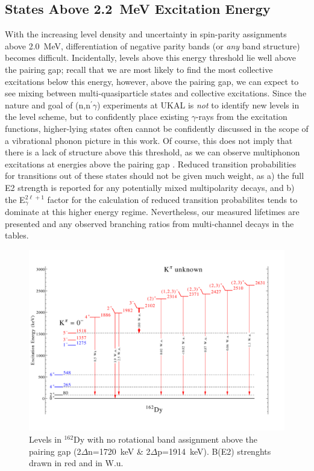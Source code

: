 \subsection{States Above 2.2~MeV Excitation Energy}
With the increasing level density and uncertainty in spin-parity assignments above 2.0~MeV, differentiation of negative parity bands (or \textit{any} band structure) becomes difficult. Incidentally, levels above this energy threshold lie well above the pairing gap; recall that we are most likely to find the most collective excitations below this energy, however, above the pairing gap, we can expect to see mixing between multi-quasiparticle states and collective excitations. Since the nature and goal of (n,n$^\prime\gamma$) experiments at UKAL is \textit{not} to identify new levels in the level scheme, but to confidently place existing $\gamma$-rays from the excitation functions, higher-lying states often cannot be confidently discussed in the scope of a vibrational phonon picture in this work. Of course, this does not imply that there is a lack of structure above this threshold, as we can observe multiphonon excitations at energies above the pairing gap \cite{Zamfir_doubleoctupole_2002, WuAprahamian_multiphonon_1994}. Reduced transition probabilities for transitions out of these states should not be given much weight, as a) the full E2 strength is reported for any potentially mixed multipolarity decays, and b) the E$_\gamma^{2\ell+1}$ factor for the calculation of reduced transition probabilites tends to dominate at this higher energy regime. Nevertheless, our measured lifetimes are presented and any observed branching ratios from multi-channel decays in the tables.

\begin{landscape}
\begin{figure}[h!]
\begin{center}
\includegraphics[height=0.85\textheight]{figures/162Dy_misc.pdf}
\end{center}
\caption{Levels in $^{162}$Dy with no rotational band assignment above the pairing gap (2$\Delta$n=1720~keV \& 2$\Delta$p=1914~keV). B(E2) strenghts drawn in red and in W.u. \label{fig:162Dy_misc}}
\end{figure}
\end{landscape}

